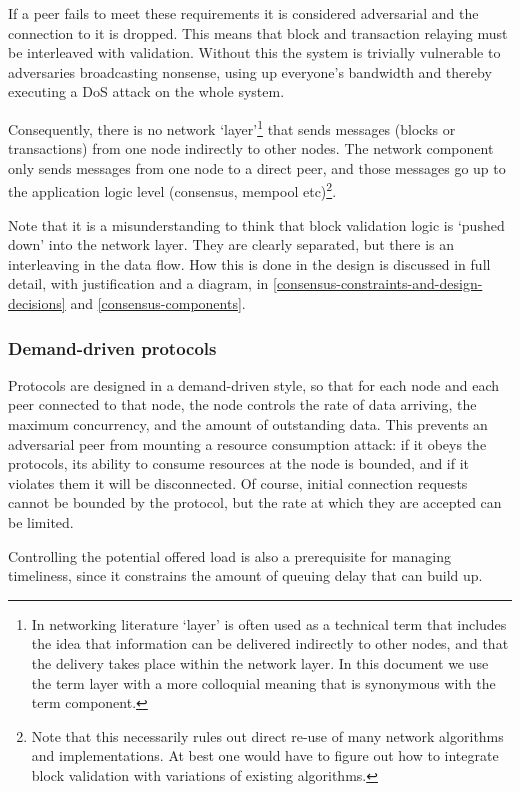 \documentclass[11pt,a4paper]{article}
\begin{document}
If a peer fails to meet these requirements it is considered adversarial
and the connection to it is dropped. This means that block and
transaction relaying must be interleaved with validation. Without this
the system is trivially vulnerable to adversaries broadcasting nonsense,
using up everyone's bandwidth and thereby executing a DoS attack on the
whole system.

Consequently, there is no network `layer'\footnote{In networking
  literature `layer' is often used as a technical term that includes the
  idea that information can be delivered indirectly to other nodes, and
  that the delivery takes place within the network layer. In this
  document we use the term layer with a more colloquial meaning that is
  synonymous with the term component.} that sends messages (blocks or
transactions) from one node indirectly to other nodes. The network
component only sends messages from one node to a direct peer, and those
messages go up to the application logic level (consensus, mempool
etc)\footnote{Note that this necessarily rules out direct re-use of many
  network algorithms and implementations. At best one would have to
  figure out how to integrate block validation with variations of
  existing algorithms.}.

Note that it is a misunderstanding to think that block validation logic
is `pushed down' into the network layer. They are clearly separated, but
there is an interleaving in the data flow. How this is done in the
design is discussed in full detail, with justification and a diagram, in
\cref{consensus-constraints-and-design-decisions} and \cref{consensus-components}.

\subsubsection{Demand-driven protocols}
\label{demand-driven-protocols}

Protocols are designed in a demand-driven style, so that for each node
and each peer connected to that node, the node controls the rate of data
arriving, the maximum concurrency, and the amount of outstanding data.
This prevents an adversarial peer from mounting a resource consumption
attack: if it obeys the protocols, its ability to consume resources at
the node is bounded, and if it violates them it will be disconnected. Of
course, initial connection requests cannot be bounded by the protocol,
but the rate at which they are accepted can be limited.

Controlling the potential offered load is also a prerequisite for
managing timeliness, since it constrains the amount of queuing delay
that can build up.
\end{document}
